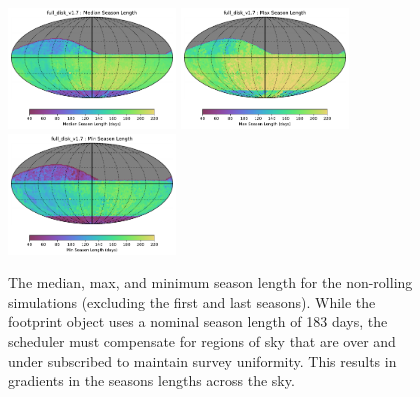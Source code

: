 \documentclass[modern]{aastex62}
\begin{document}
\begin{figure}
\includegraphics[width=1.75in]{plots/seasons/full_disk_v1_7_Median_Season_Length_HEAL_SkyMap.pdf}
\includegraphics[width=1.75in]{plots/seasons/full_disk_v1_7_Max_Season_Length_HEAL_SkyMap.pdf}
\includegraphics[width=1.75in]{plots/seasons/full_disk_v1_7_Min_Season_Length_HEAL_SkyMap.pdf}
\caption{The median, max, and minimum season length for the non-rolling simulations (excluding the first and last seasons). While the footprint object uses a nominal season length of 183 days, the scheduler must compensate for regions of sky that are over and under subscribed to maintain survey uniformity. This results in gradients in the seasons lengths across the sky.}
\end{figure}
\end{document}
